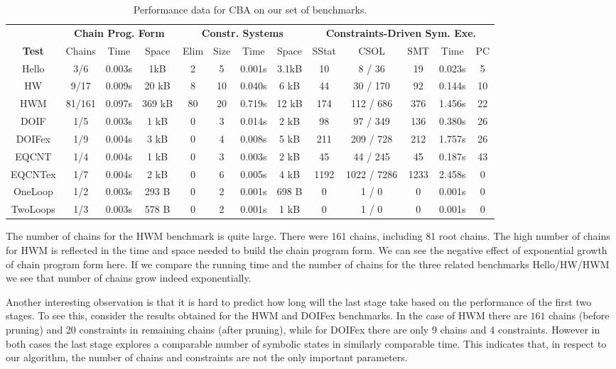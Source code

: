 \documentclass{llncs}
\newcommand{\CBATool}{\textsc{CBA}\xspace}
\begin{document}
\begin{table*}[!htb]
\centering
\vspace{-.3cm}
\begin{tabular}{||*{13}{c|}|}
\hline
&
\multicolumn{3}{c|}{\bf{Chain Prog. Form}} &
\multicolumn{4}{c|}{\bf{Constr. Systems}} &
\multicolumn{5}{c||}{\bf{Constraints-Driven Sym. Exe.}} \\
\cline{2-13}
\bf Test &
Chains & Time & Space &
Elim & Size & Time & Space &
SStat & CSOL & SMT & Time & PC \\
\hline
\hline
Hello & 3/6 & 0.003s & 1kB & 2 & 5 & 0.001s & 3.1kB & 10 & 8 / 36 & 19 & 0.023s & 5 \\
HW & 9/17 & 0.009s & 20 kB & 8 & 10 & 0.040s & 6 kB & 44 & 30 / 170 & 92 & 0.144s & 10 \\
HWM & 81/161 & 0.097s & 369 kB & 80 & 20 & 0.719s & 12 kB & 174 & 112 / 686 & 376 & 1.456s & 22 \\
DOIF & 1/5 & 0.003s & 1 kB & 0 & 3 & 0.014s & 2 kB & 98 & 97 / 349 & 136 & 0.380s & 26 \\
DOIFex & 1/9 & 0.004s & 3 kB & 0 & 4 & 0.008s & 5 kB & 211 & 209 / 728 & 212 & 1.757s & 26 \\
EQCNT & 1/4 & 0.004s & 1 kB & 0 & 3 & 0.003s & 2 kB & 45 & 44 / 245 & 45 & 0.187s & 43 \\
\hline
EQCNTex & 1/7 & 0.004s & 2 kB & 0 & 6 & 0.005s & 4 kB & 1192 & 1022 / 7286 & 1233 & 2.458s & 0 \\
OneLoop & 1/2 & 0.003s & 293 B & 0 & 2 & 0.001s & 698 B & 0 & 1 / 0 & 0 & 0.001s & 0 \\
TwoLoops & 1/3 & 0.003s & 578 B & 0 & 2 & 0.001s & 1 kB & 0 & 1 / 0 & 0 & 0.001s & 0 \\
\hline
\end{tabular}

\medskip
\caption{Performance data for \CBATool on our set of benchmarks.}
\label{TabCBProfile}
\vspace{-1cm}
\end{table*}


The number of chains for the HWM benchmark is quite large.
 There were 161 chains, including 81 root chains.
The high number of chains for HWM is reflected in the time and space needed
to build the chain program form. We can see the negative effect of exponential
growth of chain program form here. If we compare the running time and the number
of chains for the three related benchmarks Hello/HW/HWM we see that number of chains
grow indeed exponentially.

Another interesting observation is that it is hard to predict how long will
the last stage take based on the performance of the first two
stages. To see this, consider the results obtained for the HWM and DOIFex
benchmarks. In the case of HWM there are $161$ chains (before pruning) and 20
constraints in remaining chains (after pruning), while for DOIFex there are only 9 chains and 4
constraints. However in both cases the last stage explores a comparable
number of symbolic states in similarly comparable time. This indicates that,
in respect to our algorithm, the number of chains and constraints are not
the only important parameters.
\end{document}
